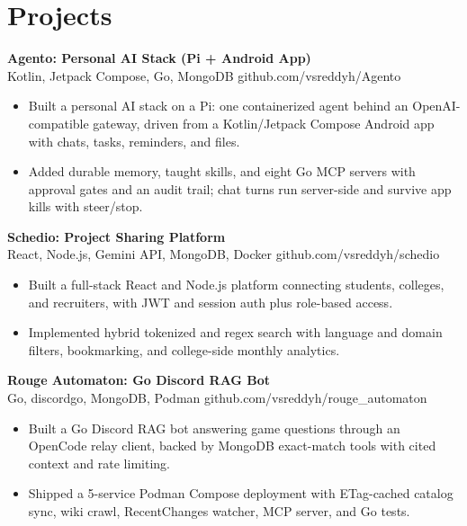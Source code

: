 \documentclass[a4paper,11pt]{article}
\newcommand{\resumeItem}[1]{\item \small{#1}}
\newcommand{\resumeSubheading}[4]{%
  \textbf{#1} \hfill \textbf{#2} \\
{#3} \hfill {#4}
}
\newcommand{\resumeSubHeadingListStart}{\begin{itemize}}
\newcommand{\resumeSubHeadingListEnd}{\end{itemize}}
\begin{document}
\section*{Projects}

\resumeSubheading
{Agento: Personal AI Stack (Pi + Android App)}{}{Kotlin, Jetpack Compose, Go, MongoDB}{github.com/vsreddyh/Agento}
\resumeSubHeadingListStart
\resumeItem{Built a personal AI stack on a Pi: one containerized agent behind an OpenAI-compatible gateway, driven from a Kotlin/Jetpack Compose Android app with chats, tasks, reminders, and files.}
\resumeItem{Added durable memory, taught skills, and eight Go MCP servers with approval gates and an audit trail; chat turns run server-side and survive app kills with steer/stop.}
\resumeSubHeadingListEnd

\resumeSubheading
{Schedio: Project Sharing Platform}{}{React, Node.js, Gemini API, MongoDB, Docker}{github.com/vsreddyh/schedio}
\resumeSubHeadingListStart
\resumeItem{Built a full-stack React and Node.js platform connecting students, colleges, and recruiters, with JWT and session auth plus role-based access.}
\resumeItem{Implemented hybrid tokenized and regex search with language and domain filters, bookmarking, and college-side monthly analytics.}
\resumeSubHeadingListEnd

\resumeSubheading
{Rouge Automaton: Go Discord RAG Bot}{}{Go, discordgo, MongoDB, Podman}{github.com/vsreddyh/rouge\_automaton}
\resumeSubHeadingListStart
\resumeItem{Built a Go Discord RAG bot answering game questions through an OpenCode relay client, backed by MongoDB exact-match tools with cited context and rate limiting.}
\resumeItem{Shipped a 5-service Podman Compose deployment with ETag-cached catalog sync, wiki crawl, RecentChanges watcher, MCP server, and Go tests.}
\resumeSubHeadingListEnd

\vspace{-0.6em}
\end{document}
